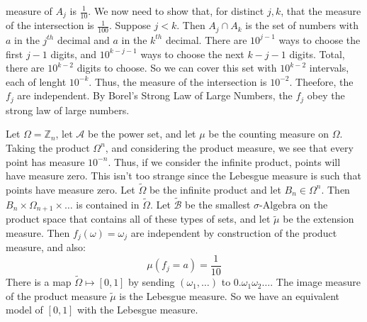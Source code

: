         measure of $A_{j}$ is $\frac{1}{10}$. We now need to
        show that, for distinct $j,k$, that the measure of the
        intersection is $\frac{1}{100}$. Suppose $j<k$. Then
        $A_{j}\cap{A}_{k}$ is the set of numbers with $a$ in
        the $j^{th}$ decimal and $a$ in the $k^{th}$ decimal.
        There are $10^{j-1}$ ways to choose the first
        $j-1$ digits, and $10^{k-j-1}$ ways to choose the
        next $k-j-1$ digits. Total, there are
        $10^{k-2}$ digits to choose. So we can cover this
        set with $10^{k-2}$ intervals, each of lenght
        $10^{\minus{k}}$. Thus, the measure of the intersection
        is $10^{\minus{2}}$. Theefore, the $f_{j}$ are
        independent. By Borel's Strong Law of Large Numbers,
        the $f_{j}$ obey the strong law of large numbers.
        \par\hfill\par
        Let $\Omega=\mathbb{Z}_{n}$, let $\mathcal{A}$ be
        the power set, and let $\mu$ be the counting
        measure on $\Omega$. Taking the product
        $\Omega^{n}$, and considering the product measure,
        we see that every point has measure $10^{\minus{n}}$.
        Thus, if we consider the infinite product, points will
        have measure zero. This isn't too strange since the
        Lebesgue measure is such that points have measure
        zero. Let $\tilde{\Omega}$ be the infinite product
        and let $B_{n}\in\Omega^{n}$. Then
        $B_{n}\times\Omega_{n+1}\times\dots$ is contained in
        $\tilde{\Omega}$. Let $\tilde{\mathcal{B}}$ be the
        smallest $\sigma\textrm{-Algebra}$ on the product
        space that contains all of these types of sets, and let
        $\tilde{\mu}$ be the extension measure. Then
        $f_{j}(\omega)=\omega_{j}$ are independent by
        construction of the product measure, and also:
        \begin{equation}
            \mu(f_{j}=a)=\frac{1}{10}
        \end{equation}
        There is a map $\tilde{\Omega}\mapsto[0,1]$ by sending
        $(\omega_{1},\dots)$ to $0.\omega_{1}\omega_{2}\dots$.
        The image measure of the product measure $\tilde{\mu}$
        is the Lebesgue measure. So we have an equivalent
        model of $[0,1]$ with the Lebesgue measure.

